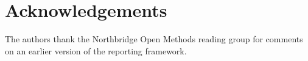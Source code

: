 \section*{Acknowledgements}

The authors thank the Northbridge Open Methods reading group for comments on an
earlier version of the reporting framework.
